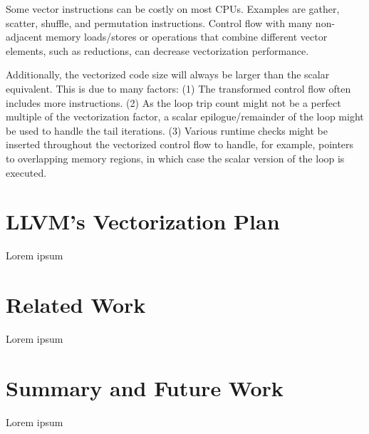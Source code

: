 \documentclass[sigplan,11pt,nonacm]{acmart}
\begin{document}
Some vector instructions can be costly on most CPUs. Examples are gather, scatter, shuffle,
and permutation instructions. Control flow with many non-adjacent memory loads/stores or 
operations that combine different vector elements, such as reductions, can decrease vectorization 
performance.

Additionally, the vectorized code size will always be larger than the scalar equivalent. This is
due to many factors: (1) The transformed control flow often includes more instructions.
(2) As the loop trip count might not be a perfect multiple of the vectorization factor, a scalar
epilogue/remainder of the loop might be used to handle the tail iterations. (3) Various runtime
checks might be inserted throughout the vectorized control flow to handle, for example, pointers 
to overlapping memory regions, in which case the scalar version of the loop is executed.





\section{LLVM's Vectorization Plan}
\label{sec:vplan}
Lorem ipsum




\section{Related Work}
\label{sec:relatedwork}
Lorem ipsum




\section{Summary and Future Work}
\label{sec:summary}
Lorem ipsum




\end{document}
